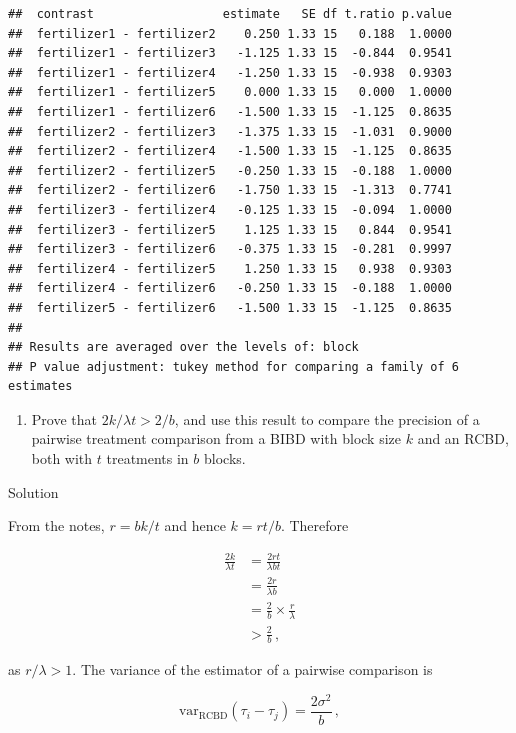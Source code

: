 \documentclass[
]{book}
\providecommand{\tightlist}{%
  \setlength{\itemsep}{0pt}\setlength{\parskip}{0pt}}
\theoremstyle{definition}
\theoremstyle{definition}
\theoremstyle{definition}
\theoremstyle{definition}
\theoremstyle{remark}
\begin{document}
\begin{enumerate}
\begin{verbatim}
##  contrast                  estimate   SE df t.ratio p.value
##  fertilizer1 - fertilizer2    0.250 1.33 15   0.188  1.0000
##  fertilizer1 - fertilizer3   -1.125 1.33 15  -0.844  0.9541
##  fertilizer1 - fertilizer4   -1.250 1.33 15  -0.938  0.9303
##  fertilizer1 - fertilizer5    0.000 1.33 15   0.000  1.0000
##  fertilizer1 - fertilizer6   -1.500 1.33 15  -1.125  0.8635
##  fertilizer2 - fertilizer3   -1.375 1.33 15  -1.031  0.9000
##  fertilizer2 - fertilizer4   -1.500 1.33 15  -1.125  0.8635
##  fertilizer2 - fertilizer5   -0.250 1.33 15  -0.188  1.0000
##  fertilizer2 - fertilizer6   -1.750 1.33 15  -1.313  0.7741
##  fertilizer3 - fertilizer4   -0.125 1.33 15  -0.094  1.0000
##  fertilizer3 - fertilizer5    1.125 1.33 15   0.844  0.9541
##  fertilizer3 - fertilizer6   -0.375 1.33 15  -0.281  0.9997
##  fertilizer4 - fertilizer5    1.250 1.33 15   0.938  0.9303
##  fertilizer4 - fertilizer6   -0.250 1.33 15  -0.188  1.0000
##  fertilizer5 - fertilizer6   -1.500 1.33 15  -1.125  0.8635
## 
## Results are averaged over the levels of: block 
## P value adjustment: tukey method for comparing a family of 6 estimates
\end{verbatim}
\end{enumerate}

\begin{enumerate}
\def\labelenumi{\arabic{enumi}.}
\setcounter{enumi}{2}
\tightlist
\item
  Prove that \(2k/\lambda t > 2/b\), and use this result to compare the precision of a pairwise treatment comparison from a BIBD with block size \(k\) and an RCBD, both with \(t\) treatments in \(b\) blocks.
\end{enumerate}

Solution

From the notes, \(r = bk / t\) and hence \(k = rt / b\). Therefore

\begin{align*}
\frac{2k}{\lambda t} & = \frac{2rt}{\lambda b t} \\
& = \frac{2r}{\lambda b} \\
& = \frac{2}{b}\times\frac{r}{\lambda} \\
& > \frac{2}{b}\,,
\end{align*}

as \(r / \lambda > 1\). The variance of the estimator of a pairwise comparison is

\[
\mbox{var}_{\mbox{RCBD}}\left(\tau_i - \tau_j\right) = \frac{2\sigma^2}{b}\,,
\]
\end{document}
